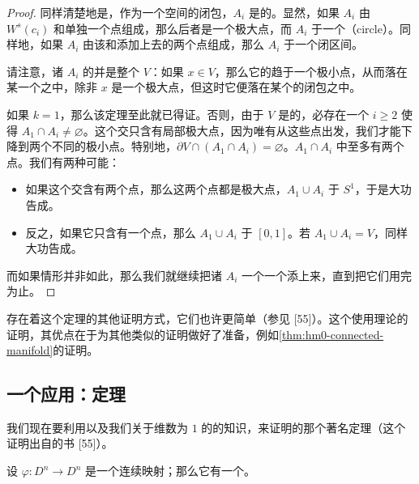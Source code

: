 \begin{proof}
同样清楚地是，作为一个\trConnected{}空间的闭包，$A_i$ 是\trConnected{}的。显然，如果 $A_i$ 由 $W^s(c_i)$ 和单独一个点组成，那么后者是一个极大点，而 $A_i$ \trDiffeomorphic{}于一个\textbf{\trCircle}（circle）。同样地，如果 $A_i$ 由该\trStableManifold{}和添加上去的两个点组成，那么 $A_i$ \trDiffeomorphic{}于一个闭区间。

请注意，诸 $A_i$ 的并是整个 $V$：如果 $x\in V$，那么它的\trTrajectory{}趋于一个极小点，从而落在某一个\trStableManifold{}之中，除非 $x$ 是一个极大点，但这时它便落在某个\trStableManifold{}的闭包之中。

如果 $k=1$，那么该定理至此就已得证。否则，由于 $V$ 是\trConnected{}的，必存在一个 $i\ge 2$ 使得 $A_1\cap A_i\ne\varnothing$。这个交只含有局部极大点，因为唯有从这些点出发，我们才能下降到两个不同的极小点。特别地，$\partial V\cap(A_1\cap A_i)=\varnothing$。$A_1\cap A_i$ 中至多有两个点。我们有两种可能：
\begin{itemize}
\item 如果这个交含有两个点，那么这两个点都是极大点，$A_1\cup A_i$ \trDiffeomorphic{}于 $S^1$，于是大功告成。
\item 反之，如果它只含有一个点，那么 $A_1\cup A_i$ \trDiffeomorphic{}于 $[0,1]$。若 $A_1\cup A_i=V$，同样大功告成。
\end{itemize}
而如果情形并非如此，那么我们就继续把诸 $A_i$ 一个一个添上来，直到把它们用完为止。
\end{proof}

存在着这个定理的其他证明方式，它们也许更简单（参见 [55]）。这个使用\trMorse{}理论的证明，其优点在于为其他类似的证明做好了准备，例如\cref{thm:hm0-connected-manifold}的证明。

\subsection{一个应用：\trBrouwer\trFixedPoint{}定理}
\label{subsec:brouwer-fixed-point-theorem}

我们现在要利用\trSardTheorem{}以及我们关于维数为 $1$ 的\trManifold{}的知识，来证明\trBrouwer{}的那个著名定理（这个证明出自\trMilnor{}的书 [55]）。

\begin{theorem}\label{thm:brouwer-fixed-point}
设 $\varphi\colon D^n\to D^n$ 是一个连续映射；那么它有一个\trFixedPoint。
\end{theorem}

